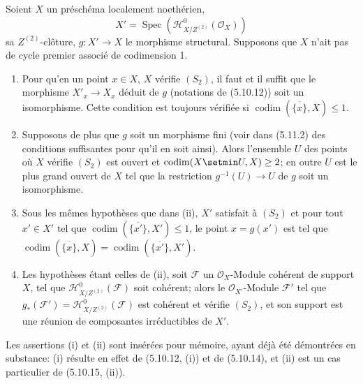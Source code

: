 \begin{proposition}[5.10.16]
\label{IV.2.s5.10.16-fr}
Soient $X$ un préschéma localement noethérien,
\[
X'=\operatorname{Spec}(\mathcal H^0_{X/Z^{(2)}}(\mathcal O_X))
\]
sa $Z^{(2)}$-clôture, $g:X'\to X$ le morphisme structural. Supposons que $X$
n'ait pas de cycle premier associé de codimension 1.
\begin{enumerate}
\item[\textup{(i)}] Pour qu'en un point $x\in X$, $X$ vérifie $(S_2)$, il faut et il
suffit que le morphisme $X'_x\to X_x$ déduit de $g$ (notations de \textup{(5.10.12)})
soit un isomorphisme. Cette condition est toujours vérifiée si
$\operatorname{codim}(\overline{\{x\}},X)\leq1$.
\item[\textup{(ii)}] Supposons de plus que $g$ soit un morphisme fini \textup{(voir dans
(5.11.2) des conditions} suffisantes \textup{pour qu'il en soit ainsi)}. Alors
l'ensemble $U$ des points où $X$ vérifie $(S_2)$ est ouvert et
$\operatorname{codim}(X\setmin U,X)\geq2$; en outre $U$ est le plus grand ouvert de
$X$ tel que la restriction $g^{-1}(U)\to U$ de $g$ soit un isomorphisme.
\item[\textup{(iii)}] Sous les mêmes hypothèses que dans \textup{(ii)}, $X'$ satisfait à $(S_2)$
et pour tout $x'\in X'$ tel que\linebreak
$\operatorname{codim}(\overline{\{x'\}},X')\leq1$, le point $x=g(x')$ est tel
que
$\operatorname{codim}(\overline{\{x\}},X)
=\operatorname{codim}(\overline{\{x'\}},X')$.
\item[\textup{(iv)}] Les hypothèses étant celles de \textup{(ii)}, soit $\mathcal F$ un
$\mathcal O_X$-Module cohérent de support $X$, tel que
$\mathcal H^0_{X/Z^{(2)}}(\mathcal F)$ soit cohérent; alors le
$\mathcal O_{X'}$-Module $\mathcal F'$ tel que
$g_*(\mathcal F')=\mathcal H^0_{X/Z^{(2)}}(\mathcal F)$ est cohérent et
vérifie $(S_2)$, et son support est une réunion de composantes irréductibles de
$X'$.
\end{enumerate}
\end{proposition}

Les assertions (i) et (ii) sont insérées pour mémoire, ayant déjà été
démontrées en substance: (i) résulte en effet de (5.10.12, (i)) et de
(5.10.14), et (ii) est un cas particulier de (5.10.15, (ii)).

